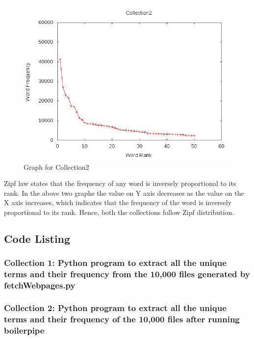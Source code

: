 \begin{figure}[ht]    
    \begin{center}
        \includegraphics[scale=0.60]{plot_graph_c2.png}
        \caption{Graph for Collection2}        
    \end{center}
\end{figure}

Zipf law states that the frequency of any word is inversely proportional to its rank. In the above two graphs the value on Y axis decreases as the value on the X axis increases, which indicates that the frequency of the word is inversely proportional to its rank. Hence, both the collections follow Zipf distribution.

\newpage
\subsection{Code Listing}
\subsubsection{Collection 1: Python program to extract all the unique terms and their frequency from the 10,000 files generated by fetchWebpages.py}


\newpage

\subsubsection{Collection 2: Python program to extract all the unique terms and their frequency of the 10,000 files after running boilerpipe}

\newpage

